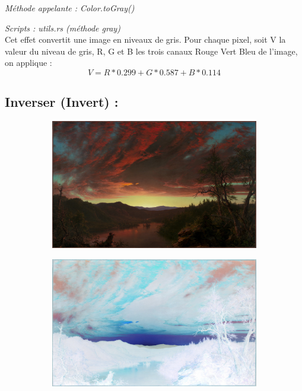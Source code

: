 \emph{Méthode appelante : Color.toGray()}

\emph{Scripts : utils.rs (méthode gray)} 
\\

Cet effet convertit une image en niveaux de gris. Pour chaque pixel, soit V la valeur du niveau de gris, R, G et B les trois canaux Rouge Vert Bleu de l'image, on applique :
\[            
    V =  R*0.299 + G*0.587 + B*0.114
\]

\subsection{Inverser (Invert) :}

\begin{figure}[!h]
    \centering
    \begin{subfigure}[b]{0.3\textwidth}
        \includegraphics[width=1\textwidth]{report_src/effects/original1.jpeg}
    \end{subfigure}
    \begin{subfigure}[b]{0.3\textwidth}
        \includegraphics[width=1\textwidth]{report_src/effects/invert.jpeg}
    \end{subfigure}
\end{figure} 

